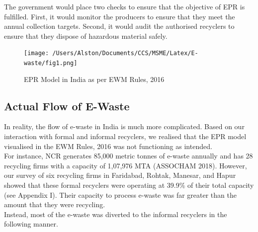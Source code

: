 \documentclass[a4paper, 12pt]{article}
\begin{document}
                    The government would place two checks to ensure that the objective of EPR is fulfilled. First, it would monitor the producers to ensure that they meet the annual collection targets. Second, it would audit the authorised recyclers to ensure that they dispose of hazardous material safely.\\
                    
                    \begin{figure}[H]
                    	\centering
                    	\texttt{[image: /Users/Alston/Documents/CCS/MSME/Latex/E-waste/fig1.png]}
                    	\caption[Optional Caption]{EPR Model in India as per EWM Rules, 2016}
                    \end{figure}
                    
                    \subsection{Actual Flow of E-Waste}
                    
                    In reality, the flow of e-waste in India is much more complicated. Based on our interaction with formal and informal recyclers, we realised that the EPR model visualised in the EWM Rules, 2016 was not functioning as intended. \\
                    
                    For instance, NCR generates 85,000 metric tonnes of e-waste annually and has 28 recycling firms with a capacity of 1,07,976 MTA (ASSOCHAM 2018). However, our survey of six recycling firms in Faridabad, Rohtak, Manesar, and Hapur showed that these formal recyclers were operating at 39.9\% of their total capacity (see Appendix I). Their capacity to process e-waste was far greater than the amount that they were recycling. \\
                    
                    Instead, most of the e-waste was diverted to the informal recyclers in the following manner.\\
                    
\end{document}

